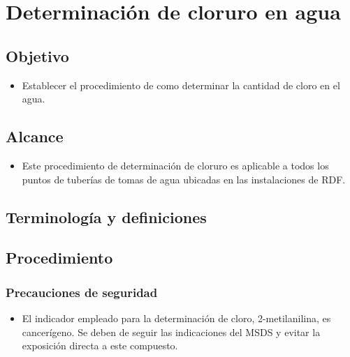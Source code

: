\thispagestyle{formato-PI}
\renewcommand{\MenorVer}{0}
\renewcommand{\MayorVer}{2}
\renewcommand{\Codigo}{HYS-21-IT}
\renewcommand{\FechaPub}{2023--01}
\renewcommand{\Titulo}{Determinación de cloruro en agua}

\section{\Titulo}

\subsection{Objetivo}
\begin{itemize}
	\item Establecer el procedimiento de como determinar la cantidad de cloro en el agua.
\end{itemize}

\subsection{Alcance}
\begin{itemize}
	\item Este procedimiento de determinación de cloruro es aplicable a todos los puntos de tuberías de tomas de agua ubicadas en las instalaciones de \gls{RDF}.
\end{itemize}

\subsection{Terminología y definiciones}
\begin{description}
\end{description}

\subsection{Procedimiento}
\subsubsection{Precauciones de seguridad}
\begin{itemize}
	\item El indicador empleado para la determinación de cloro, 2-metilanilina, es cancerígeno. Se deben de seguir las indicaciones del MSDS y evitar la exposición directa a este compuesto.
\end{itemize}

